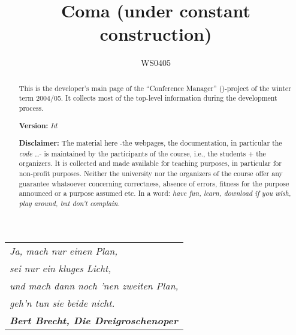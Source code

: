 \documentclass[11pt]{article}
\title{{\huge\bf Coma} (under constant construction)}
\author{WS0405}
\date{}
\begin{document}
\vspace{-2cm}





\maketitle{}



\begin{abstract}
  This is the developer's main page of the ``Conference Manager''
  (\Coma)-project of the winter term 2004/05. It collects most of the
  top-level information during the development process.

  \medskip
  
  \textbf{Version:} \texttt{$Id$}
  
  \medskip
  
  \textbf{Disclaimer:} The material here -the webpages, the documentation,
  in particular the \emph{code} \ldots- is maintained by the participants
  of the course, i.e., the students + the organizers. It is collected and
  made available for teaching purposes, in particular for non-profit
  purposes. Neither the university nor the organizers of the course offer
  any guarantee whatsoever concerning correctness, absence of errors,
  fitness for the purpose announced or a purpose assumed etc. In a word:
  \emph{have fun, learn, download if you wish, play around, but don't
    complain.}
\end{abstract}




%



%



{\centering
  \begin{minipage}{10cm}
    \begin{tabular}[t]{l}
    \em
    Ja, mach nur einen Plan, 
    \\
    \emph{sei nur ein kluges Licht, }
    \\ 
    \emph{und mach dann noch 'nen zweiten Plan, }
    \\
    \emph{geh'n tun sie beide nicht.}
    \\
    \textbf{\em Bert Brecht, Die Dreigroschenoper}
\end{tabular}
  \end{minipage}}






%

%








%
%
\end{document}
